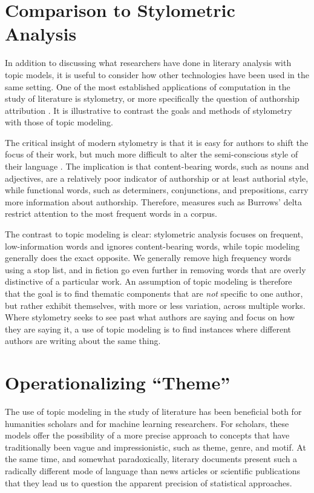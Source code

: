 \section{Comparison to Stylometric Analysis}

In addition to discussing what researchers have done in literary analysis with topic models, it is useful to consider how other technologies have been used in the same setting.
One of the most established applications of computation in the study of literature is stylometry, or more specifically the question of authorship attribution \citep{juola2006authorship}.
It is illustrative to contrast the goals and methods of stylometry with those of topic modeling.

The critical insight of modern stylometry is that it is easy for authors to shift the focus of their work, but much more difficult to alter the semi-conscious style of their language \citep{mosteller1964inference}.
The implication is that content-bearing words, such as nouns and adjectives, are a relatively poor indicator of authorship or at least authorial style, while functional words, such as determiners, conjunctions, and prepositions, carry more information about authorship.
Therefore, measures such as Burrows' delta \citep{burrows2002delta} restrict attention to the most frequent words in a corpus.

The contrast to topic modeling is clear: stylometric analysis focuses on frequent, low-information words and ignores content-bearing words, while topic modeling generally does the exact opposite.
We generally remove high frequency words using a stop list, and in fiction go even further in removing words that are overly distinctive of a particular work.
An assumption of topic modeling is therefore that the goal is to find thematic components that are {\em not} specific to one author, but rather exhibit themselves, with more or less variation, across multiple works.
Where stylometry seeks to see past what authors are saying and focus on how they are saying it, a use of topic modeling is to find instances where different authors are writing about the same thing.

\section{Operationalizing ``Theme''}

The use of topic modeling in the study of literature has been beneficial both for humanities scholars and for machine learning researchers.
For scholars, these models offer the possibility of a more precise approach to concepts that have traditionally been vague and impressionistic, such as theme, genre, and motif.
At the same time, and somewhat paradoxically, literary documents present such a radically different mode of language than news articles or scientific publications that they lead us to question the apparent precision of statistical approaches.

